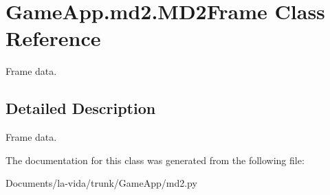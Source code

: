 \hypertarget{classGameApp_1_1md2_1_1MD2Frame}{
\section{GameApp.md2.MD2Frame Class Reference}
\label{classGameApp_1_1md2_1_1MD2Frame}
}
Frame data.  




\subsection{Detailed Description}
Frame data. 

The documentation for this class was generated from the following file:\begin{CompactItemize}
\item 
Documents/la-vida/trunk/GameApp/md2.py\end{CompactItemize}
